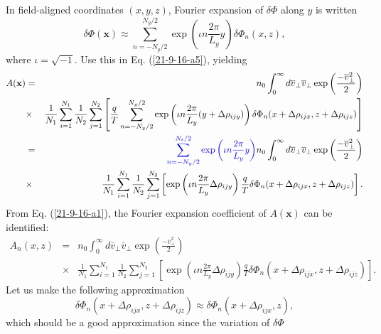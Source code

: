 \documentclass{article}
\newcommand{\tmcolor}[2]{{\color{#1}{#2}}}
\begin{document}
In field-aligned coordinates $(x, y, z)$, Fourier expansion of $\delta \Phi$
along $y$ is written
\begin{equation}
  \delta \Phi (\mathbf{x}) \approx \sum_{n = - N_y / 2}^{N_y / 2} \exp \left(
  \iota n \frac{2 \pi}{L_y} y \right) \delta \Phi_n (x, z),
\end{equation}
where $\iota = \sqrt{- 1}$. Use this in Eq. (\ref{21-9-16-a5}), yielding
\begin{eqnarray}
  A (\mathbf{x}) & = & n_0  \int_0^{\infty} d \overline{v}_{\perp}
  \overline{v}_{\perp} \exp \left( \frac{- \overline{v}^2_{\perp}}{2} \right)
  \nonumber\\
  & \times & \frac{1}{N_1} \sum_{i = 1}^{N_1} \frac{1}{N_2}  \sum_{j =
  1}^{N_2} \left[ \frac{q}{T}  \sum_{n = - N_y / 2}^{N_y / 2} \exp \left(
  \iota n \frac{2 \pi}{L_y} (y + \Delta \rho_{i j y}) \right) \delta \Phi_n (x
  + \Delta \rho_{i j x}, z + \Delta \rho_{i j z}) \right] \nonumber\\
  & = &  \tmcolor{blue}{\sum_{n = - N_y / 2}^{N_t / 2} \exp \left( \iota n
  \frac{2 \pi}{L_y} y \right)} n_0 \int_0^{\infty} d \overline{v}_{\perp}
  \overline{v}_{\perp} \exp \left( \frac{- \overline{v}^2_{\perp}}{2} \right)
  \nonumber\\
  & \times & \frac{1}{N_1} \sum_{i = 1}^{N_1} \frac{1}{N_2}  \sum_{j =
  1}^{N_2} \left[ \exp \left( \iota n \frac{2 \pi}{L_y} \Delta \rho_{i j y}
  \right) \frac{q}{T} \delta \Phi_n (x + \Delta \rho_{i j x}, z + \Delta
  \rho_{i j z}) \right] .  \label{21-9-16-a1}
\end{eqnarray}
From Eq. (\ref{21-9-16-a1}), the Fourier expansion coefficient of $A
(\mathbf{x})$ can be identified:
\begin{eqnarray}
  A_n (x, z) & = & n_0  \int_0^{\infty} d \overline{v}_{\perp}
  \overline{v}_{\perp} \exp \left( \frac{- \overline{v}^2_{\perp}}{2} \right)
  \nonumber\\
  & \times & \frac{1}{N_1} \sum_{i = 1}^{N_1} \frac{1}{N_2}  \sum_{j =
  1}^{N_2} \left[ \exp \left( \iota n \frac{2 \pi}{L_y} \Delta \rho_{i j y}
  \right) \frac{q}{T} \delta \Phi_n (x + \Delta \rho_{i j x}, z + \Delta
  \rho_{i j z}) \right] .  \label{22-12-21-1}
\end{eqnarray}
Let us make the following approximation
\begin{equation}
  \label{22-12-21-3} \delta \Phi_n (x + \Delta \rho_{i j x}, z + \Delta
  \rho_{i j z}) \approx \delta \Phi_n (x + \Delta \rho_{i j x}, z),
\end{equation}
which should be a good approximation since the variation of $\delta \Phi$
\end{document}
